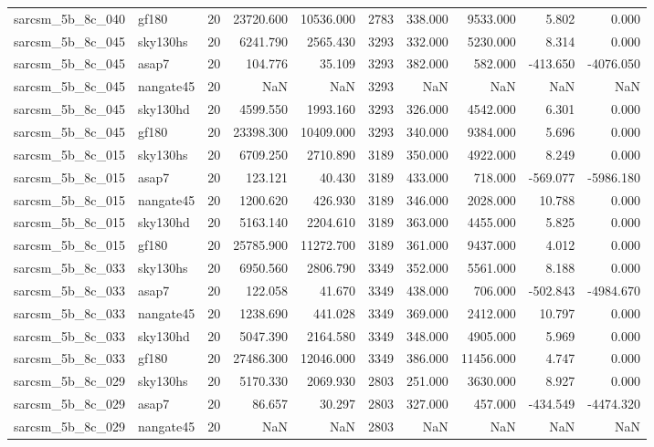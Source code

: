 \begin{longtable}{llrrrrrrrr}
sarcsm\_5b\_8c\_040 & gf180 & 20 & 23720.600 & 10536.000 & 2783 & 338.000 & 9533.000 & 5.802 & 0.000 \\
sarcsm\_5b\_8c\_045 & sky130hs & 20 & 6241.790 & 2565.430 & 3293 & 332.000 & 5230.000 & 8.314 & 0.000 \\
sarcsm\_5b\_8c\_045 & asap7 & 20 & 104.776 & 35.109 & 3293 & 382.000 & 582.000 & -413.650 & -4076.050 \\
sarcsm\_5b\_8c\_045 & nangate45 & 20 & NaN & NaN & 3293 & NaN & NaN & NaN & NaN \\
sarcsm\_5b\_8c\_045 & sky130hd & 20 & 4599.550 & 1993.160 & 3293 & 326.000 & 4542.000 & 6.301 & 0.000 \\
sarcsm\_5b\_8c\_045 & gf180 & 20 & 23398.300 & 10409.000 & 3293 & 340.000 & 9384.000 & 5.696 & 0.000 \\
sarcsm\_5b\_8c\_015 & sky130hs & 20 & 6709.250 & 2710.890 & 3189 & 350.000 & 4922.000 & 8.249 & 0.000 \\
sarcsm\_5b\_8c\_015 & asap7 & 20 & 123.121 & 40.430 & 3189 & 433.000 & 718.000 & -569.077 & -5986.180 \\
sarcsm\_5b\_8c\_015 & nangate45 & 20 & 1200.620 & 426.930 & 3189 & 346.000 & 2028.000 & 10.788 & 0.000 \\
sarcsm\_5b\_8c\_015 & sky130hd & 20 & 5163.140 & 2204.610 & 3189 & 363.000 & 4455.000 & 5.825 & 0.000 \\
sarcsm\_5b\_8c\_015 & gf180 & 20 & 25785.900 & 11272.700 & 3189 & 361.000 & 9437.000 & 4.012 & 0.000 \\
sarcsm\_5b\_8c\_033 & sky130hs & 20 & 6950.560 & 2806.790 & 3349 & 352.000 & 5561.000 & 8.188 & 0.000 \\
sarcsm\_5b\_8c\_033 & asap7 & 20 & 122.058 & 41.670 & 3349 & 438.000 & 706.000 & -502.843 & -4984.670 \\
sarcsm\_5b\_8c\_033 & nangate45 & 20 & 1238.690 & 441.028 & 3349 & 369.000 & 2412.000 & 10.797 & 0.000 \\
sarcsm\_5b\_8c\_033 & sky130hd & 20 & 5047.390 & 2164.580 & 3349 & 348.000 & 4905.000 & 5.969 & 0.000 \\
sarcsm\_5b\_8c\_033 & gf180 & 20 & 27486.300 & 12046.000 & 3349 & 386.000 & 11456.000 & 4.747 & 0.000 \\
sarcsm\_5b\_8c\_029 & sky130hs & 20 & 5170.330 & 2069.930 & 2803 & 251.000 & 3630.000 & 8.927 & 0.000 \\
sarcsm\_5b\_8c\_029 & asap7 & 20 & 86.657 & 30.297 & 2803 & 327.000 & 457.000 & -434.549 & -4474.320 \\
sarcsm\_5b\_8c\_029 & nangate45 & 20 & NaN & NaN & 2803 & NaN & NaN & NaN & NaN \\

\end{longtable}
